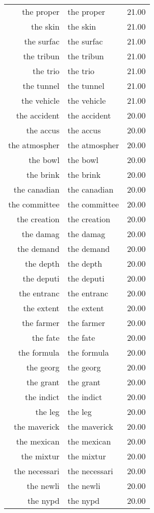 \begin{table}[ht]
\begin{tabular}{rlr}
  the proper & the proper & 21.00 \\ 
  the skin & the skin & 21.00 \\ 
  the surfac & the surfac & 21.00 \\ 
  the tribun & the tribun & 21.00 \\ 
  the trio & the trio & 21.00 \\ 
  the tunnel & the tunnel & 21.00 \\ 
  the vehicle & the vehicle & 21.00 \\ 
  the accident & the accident & 20.00 \\ 
  the accus & the accus & 20.00 \\ 
  the atmospher & the atmospher & 20.00 \\ 
  the bowl & the bowl & 20.00 \\ 
  the brink & the brink & 20.00 \\ 
  the canadian & the canadian & 20.00 \\ 
  the committee & the committee & 20.00 \\ 
  the creation & the creation & 20.00 \\ 
  the damag & the damag & 20.00 \\ 
  the demand & the demand & 20.00 \\ 
  the depth & the depth & 20.00 \\ 
  the deputi & the deputi & 20.00 \\ 
  the entranc & the entranc & 20.00 \\ 
  the extent & the extent & 20.00 \\ 
  the farmer & the farmer & 20.00 \\ 
  the fate & the fate & 20.00 \\ 
  the formula & the formula & 20.00 \\ 
  the georg & the georg & 20.00 \\ 
  the grant & the grant & 20.00 \\ 
  the indict & the indict & 20.00 \\ 
  the leg & the leg & 20.00 \\ 
  the maverick & the maverick & 20.00 \\ 
  the mexican & the mexican & 20.00 \\ 
  the mixtur & the mixtur & 20.00 \\ 
  the necessari & the necessari & 20.00 \\ 
  the newli & the newli & 20.00 \\ 
  the nypd & the nypd & 20.00 \\ 

\end{tabular}
\end{table}
